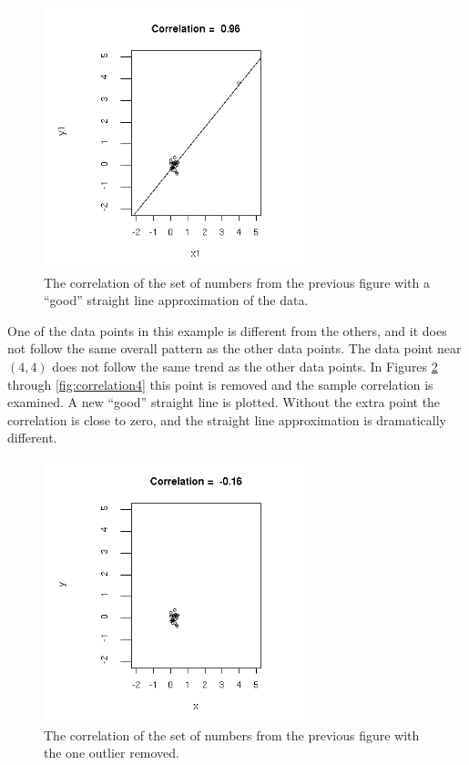 \documentclass[12pt]{article}
\begin{document}
\begin{figure}[tb]
  \centerline{\includegraphics[height=3in]{correlation2}}
  \caption{The correlation of the set of numbers from the previous
    figure with a ``good'' straight line approximation of the data.}
  \label{fig:correlation2}
\end{figure}

One of the data points in this example is different from the others,
and it does not follow the same overall pattern as the other data
points. The data point near $(4,4)$ does not follow the same trend as
the other data points. In Figures \ref{fig:correlation3} through
\ref{fig:correlation4} this point is removed and the sample
correlation is examined. A new ``good'' straight line is plotted.
Without the extra point the correlation is close to zero, and the
straight line approximation is dramatically different.

\begin{figure}[tb]
  \centerline{\includegraphics[height=3in]{correlation3}}
  \caption{The correlation of the set of numbers from the previous
    figure with the one outlier removed.}
  \label{fig:correlation3}
\end{figure}
\end{document}
